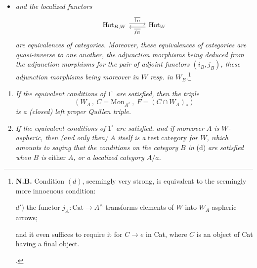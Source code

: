 
\begin{itemize}[label={},leftmargin=4.5em]
\item \textit{and the localized functors}
\[
\begin{tikzcd}
\mathrm{Hot}_{B,W} \arrow[r, shift left, "\overline{i_B}"] & \mathrm{Hot}_W \arrow[l, shift left, "\overline{j_B}"]
\end{tikzcd}
\]
\textit{are equivalences of categories. Moreover, these equivalences of categories are quasi-inverse to one another, the adjunction morphisms being deduced from the adjunction morphisms for the pair of adjoint functors $(i_B, j_B)$, these adjunction morphisms being moreover in $W$ resp. in $W_B$.}\footnote[38]{\textbf{N.B.} Condition $(d)$, seemingly very strong, is equivalent to the seemingly more innocuous condition:\par
$d'$) the functor $j_A : \mathrm{Cat} \longrightarrow A^\wedge$ transforms elements of $W$ into $W_A$-aspheric arrows;\par\noindent
and it even suffices to require it for $C \longrightarrow e$ in Cat, where $C$ is an object of Cat having a final object.\par\noindent
.}
\end{itemize}


\begin{enumerate}[leftmargin=2.5em]
\item[$2^\circ$)] \textit{If the equivalent conditions of $1^\circ$ are satisfied, then the triple}
\[
(W_A\,,\ C = \mathrm{Mon}_{A^\wedge}\,,\ F = (C \cap W_A)_*)
\]
\textit{is a (closed) left proper Quillen triple.}
\item[$3^\circ$)] \textit{If the equivalent conditions of $1^\circ$ are satisfied, and if moreover $A$ is $W$-aspheric, then (and only then) $A$ itself is a} test category \textit{for $W$, which amounts to saying that the conditions on the category $B$ in} (d) \textit{are satisfied when $B$ is} either \textit{$A$, or a localized category $A/a$.}
\end{enumerate}


